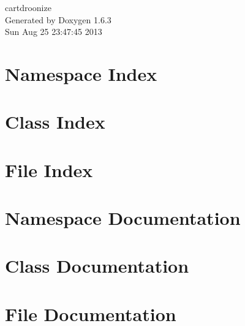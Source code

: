 \documentclass[a4paper]{book}
\begin{document}
\hypersetup{pageanchor=false}
\begin{titlepage}
\vspace*{7cm}
\begin{center}
{\Large cartdroonize }\\
\vspace*{1cm}
{\large Generated by Doxygen 1.6.3}\\
\vspace*{0.5cm}
{\small Sun Aug 25 23:47:45 2013}\\
\end{center}
\end{titlepage}
\clearemptydoublepage
{}
\tableofcontents
\clearemptydoublepage
{}
\hypersetup{pageanchor=true}
\chapter{Namespace Index}

\chapter{Class Index}

\chapter{File Index}

\chapter{Namespace Documentation}



\chapter{Class Documentation}











\chapter{File Documentation}




\printindex
\end{document}

